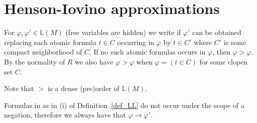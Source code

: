 \documentclass[12pt,letterpaper,oneside,reqno]{amsart}
\theoremstyle{plain}
\newtheorem{proposition}[theorem]{Proposition}
\theoremstyle{remark}
\renewcommand*{\emph}[1]{%
   \smash{\tikz[baseline]\node[rectangle, fill=olive!25, rounded corners, inner xsep=0.5ex, inner ysep=0.2ex, anchor=base, minimum height = 2.7ex]{#1};}}
\begin{document}
\section{Henson-Iovino approximations}\label{ultrapws}


For $\varphi,\varphi'\in\mathds{L}(M)$ (free variables are hidden) we write \emph{$\varphi'>\varphi$\/} if $\varphi'$ can be obtained replacing each atomic formula $t\in C$ occurring in $\varphi$ by $t\in C'$ where $C'$ is some compact neighborhood of $C$.
If no such atomic formulas occurs in $\varphi$, then $\varphi>\varphi$.
By the normality of $R$ we also have $\varphi>\varphi$ when $\varphi=(t\in C)$ for some clopen set $C$.

Note that $>$ is a dense (pre)order of $\mathds{L}(M)$.

Formulas in as in (i) of Definition~\ref{def_LL} do not occur under the scope of a negation, therefore we always have that $\varphi\to\varphi'$.




  
  






\end{document}

